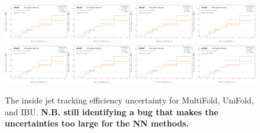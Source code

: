 \begin{figure}[h!]
\includegraphics[width=0.25\textwidth,page=66]{figures/SimResults/TrackJet_SystEffect.pdf}\includegraphics[width=0.25\textwidth,page=70]{figures/SimResults/TrackJet_SystEffect.pdf}\includegraphics[width=0.25\textwidth,page=74]{figures/SimResults/TrackJet_SystEffect.pdf}\includegraphics[width=0.25\textwidth,page=78]{figures/SimResults/TrackJet_SystEffect.pdf}\\
\includegraphics[width=0.25\textwidth,page=82]{figures/SimResults/TrackJet_SystEffect.pdf}\includegraphics[width=0.25\textwidth,page=86]{figures/SimResults/TrackJet_SystEffect.pdf}\includegraphics[width=0.25\textwidth,page=90]{figures/SimResults/TrackJet_SystEffect.pdf}\includegraphics[width=0.25\textwidth,page=94]{figures/SimResults/TrackJet_SystEffect.pdf}
\caption{The inside jet tracking efficiency uncertainty for MultiFold, UniFold, and IBU.  \textbf{N.B. still identifying a bug that makes the uncertainties too large for the NN methods.}}
\label{fig:simresultsmulti_trackjetuncertsl2a}
\end{figure}

